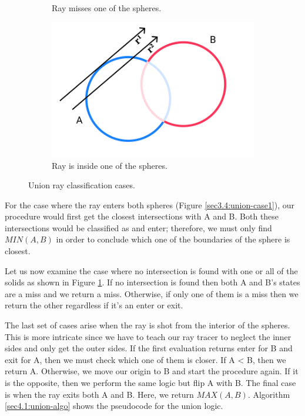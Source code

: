 \documentclass[a4paper,11pt,oneside]{article}
\begin{document}
\begin{figure}[ht]
\begin{subfigure}[b]{0.3\textwidth}
		\caption{Ray misses one of the spheres.}
		\label{sec3.4:union-case2}
	\end{subfigure}
	\hfill
	\begin{subfigure}[b]{0.3\textwidth}
		\centering
		\includegraphics[width=\textwidth]{section4/4.1/union-case-3.png}
		\caption{Ray is inside one of the spheres.}
		\label{sec3.4:union-case3}
	\end{subfigure}
	\caption{Union ray classification cases.}
	\label{sec3.4:sphere-union}
\end{figure}

For the case where the ray enters both spheres (Figure \ref{sec3.4:union-case1}), our procedure would first get the closest intersections with A and B. Both these intersections would be classified as and enter; therefore, we must only find $MIN(A, B)$ in order to conclude which one of the boundaries of the sphere is closest.

Let us now examine the case where no intersection is found with one or all of the solids as shown in Figure \ref{sec3.4:union-case2}. If no intersection is found then both A and B's states are a miss and we return a miss. Otherwise, if only one of them is a miss then we return the other regardless if it's an enter or exit.

The last set of cases arise when the ray is shot from the interior of the spheres. This is more intricate since we have to teach our ray tracer to neglect the inner sides and only get the outer sides. If the first evaluation returns enter for B and exit for A, then we must check which one of them is closer. If A < B, then we return A. Otherwise, we move our origin to B and start the procedure again. If it is the opposite, then we perform the same logic but flip A with B. The final case is when the ray exits both A and B. Here, we return $MAX(A, B)$. Algorithm \ref{sec4.1:union-algo} shows the pseudocode for the union logic.
\end{document}
